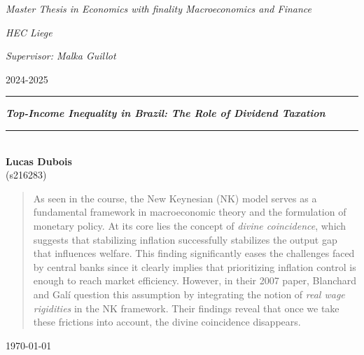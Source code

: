 \documentclass[a4paper, 12pt]{article}
\begin{document}
\pagestyle{fancy}
\fancyhf{}
\rhead{\today}
\cfoot{\thepage}
\renewcommand{\headrulewidth}{0pt}
\begin{titlepage}
\vspace{12cm}
\par
\textit{Master Thesis in Economics with finality Macroeconomics and Finance}
\par
\textit{HEC Liege}
\par
\textit{Supervisor: Malka Guillot}
\par
2024-2025
\begin{center}
\rule{\linewidth}{1pt}
\vspace{0,5cm}
\vspace{0.75cm}
\begin{spacing}{1.75}
{\LARGE \textbf{\textit{Top-Income Inequality in Brazil: The Role of Dividend Taxation}}}
\vspace{0.75cm}
\end{spacing}
\rule{\linewidth}{1pt}
\vspace{0,5cm}
\\
\textbf{{\large Lucas Dubois}}
\\
\vspace{0,5cm}
{(s216283)}\end{center}
\vspace{0.5cm}
\begin{abstract}
    \hspace{1cm} As seen in the course, the New Keynesian (NK) model serves as a fundamental framework in macroeconomic theory and the formulation of monetary policy. 
At its core lies the concept of \textit{divine coincidence}, which suggests that stabilizing inflation successfully stabilizes the output gap that influences welfare. 
This finding significantly eases the challenges faced by central banks since it clearly implies that prioritizing inflation control is enough to reach market efficiency.
However, in their 2007 paper, Blanchard and Galí question this assumption by integrating the notion of \textit{real wage rigidities } in the NK framework. 
Their findings reveal that once we take these frictions into account, the divine coincidence disappears.
\end{abstract}

\vspace{3cm}

\begin{center}
{\Large \today}
\end{center}
\end{titlepage}
\tableofcontents
\newpage
\end{document}
